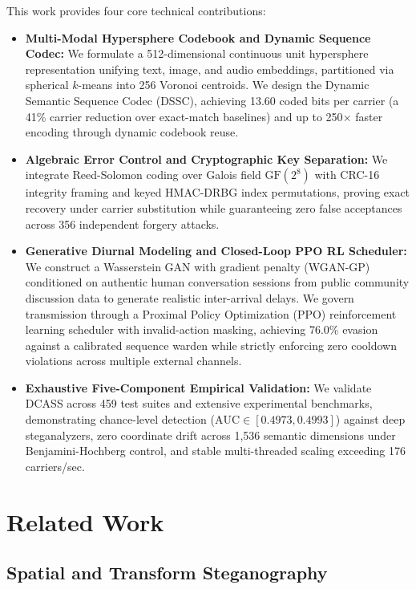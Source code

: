 \documentclass[11pt,journal,onecolumn]{IEEEtran}\linespread{1.3}
\begin{document}
This work provides four core technical contributions:
\begin{itemize}
    \item \textbf{Multi-Modal Hypersphere Codebook and Dynamic Sequence Codec:} We formulate a 512-dimensional continuous unit hypersphere representation unifying text, image, and audio embeddings, partitioned via spherical $k$-means into 256 Voronoi centroids. We design the Dynamic Semantic Sequence Codec (DSSC), achieving 13.60 coded bits per carrier (a 41\% carrier reduction over exact-match baselines) and up to 250$\times$ faster encoding through dynamic codebook reuse.
    \item \textbf{Algebraic Error Control and Cryptographic Key Separation:} We integrate Reed-Solomon coding over Galois field $\text{GF}(2^8)$ with CRC-16 integrity framing and keyed HMAC-DRBG index permutations, proving exact recovery under carrier substitution while guaranteeing zero false acceptances across 356 independent forgery attacks.
    \item \textbf{Generative Diurnal Modeling and Closed-Loop PPO RL Scheduler:} We construct a Wasserstein GAN with gradient penalty (WGAN-GP) conditioned on authentic human conversation sessions from public community discussion data to generate realistic inter-arrival delays. We govern transmission through a Proximal Policy Optimization (PPO) reinforcement learning scheduler with invalid-action masking, achieving 76.0\% evasion against a calibrated sequence warden while strictly enforcing zero cooldown violations across multiple external channels.
    \item \textbf{Exhaustive Five-Component Empirical Validation:} We validate DCASS across 459 test suites and extensive experimental benchmarks, demonstrating chance-level detection ($\text{AUC} \in [0.4973, 0.4993]$) against deep steganalyzers, zero coordinate drift across 1,536 semantic dimensions under Benjamini-Hochberg control, and stable multi-threaded scaling exceeding 176 carriers/sec.
\end{itemize}

\section{Related Work}

\subsection{Spatial and Transform Steganography}
\end{document}
